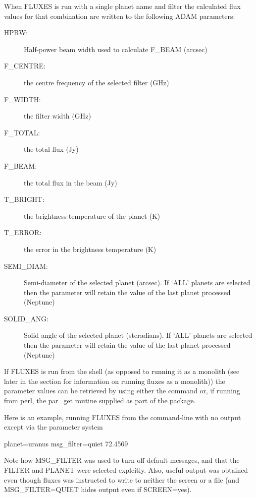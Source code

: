 \documentclass[11pt,twoside]{starlink}
\begin{document}
When FLUXES is run with a single planet name and filter the calculated
flux values for that combination are written to the following
ADAM parameters:

\begin{description}
\item[HPBW:] Half-power beam width used to calculate F\_BEAM (arcsec)
\item[F\_CENTRE:] the centre frequency of the selected filter (GHz)
\item[F\_WIDTH:] the filter width (GHz)
\item[F\_TOTAL:] the total flux (Jy)
\item[F\_BEAM:] the total flux in the beam (Jy)
\item[T\_BRIGHT:] the brightness temperature of the planet (K)
\item[T\_ERROR:] the error in the brightness temperature (K)
\item[SEMI\_DIAM:] Semi-diameter of the selected planet (arcsec).
If `ALL' planets are selected then the parameter will retain the
value of the last planet processed (Neptune)
\item[SOLID\_ANG:] Solid angle of the selected planet (steradians).
If `ALL' planets are selected then the parameter will retain the
value of the last planet processed (Neptune)
\end{description}

If FLUXES is run from the shell (as opposed to running it as a
monolith (see later in the section for information on running fluxes
as a monolith)) the parameter values can be retrieved by using either
the   command
or, if running from perl, the par\_get routine supplied as part of the
 package.

Here is an example, running FLUXES from the command-line with
no output except via the parameter system

\begin{terminalv}
       planet=uranus msg_filter=quiet
72.4569
\end{terminalv}

Note how MSG\_FILTER was used to turn off default messages, and
that the FILTER and PLANET were selected explcitly. Also, useful
output was obtained even though fluxes was instructed to write
to neither the screen or a file (and MSG\_FILTER=QUIET hides
output even if SCREEN=yes).
\end{document}

